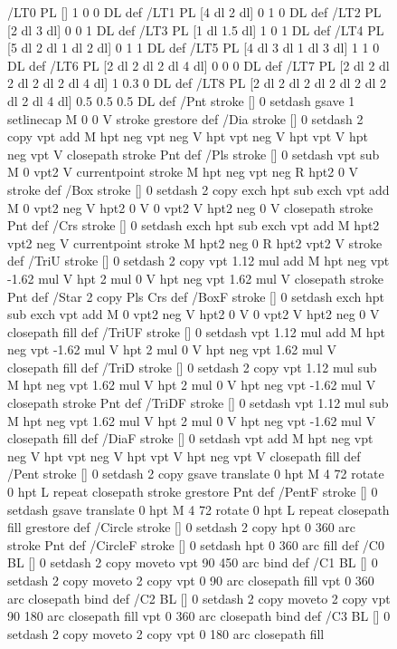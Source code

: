 \documentclass{LMCS}
\begin{document}
\begin{figure}[!tbp]
\begin{minipage}[b]{.47\linewidth}
{{{/LT0 { PL [] 1 0 0 DL } def
/LT1 { PL [4 dl 2 dl] 0 1 0 DL } def
/LT2 { PL [2 dl 3 dl] 0 0 1 DL } def
/LT3 { PL [1 dl 1.5 dl] 1 0 1 DL } def
/LT4 { PL [5 dl 2 dl 1 dl 2 dl] 0 1 1 DL } def
/LT5 { PL [4 dl 3 dl 1 dl 3 dl] 1 1 0 DL } def
/LT6 { PL [2 dl 2 dl 2 dl 4 dl] 0 0 0 DL } def
/LT7 { PL [2 dl 2 dl 2 dl 2 dl 2 dl 4 dl] 1 0.3 0 DL } def
/LT8 { PL [2 dl 2 dl 2 dl 2 dl 2 dl 2 dl 2 dl 4 dl] 0.5 0.5 0.5 DL } def
/Pnt { stroke [] 0 setdash
   gsave 1 setlinecap M 0 0 V stroke grestore } def
/Dia { stroke [] 0 setdash 2 copy vpt add M
  hpt neg vpt neg V hpt vpt neg V
  hpt vpt V hpt neg vpt V closepath stroke
  Pnt } def
/Pls { stroke [] 0 setdash vpt sub M 0 vpt2 V
  currentpoint stroke M
  hpt neg vpt neg R hpt2 0 V stroke
  } def
/Box { stroke [] 0 setdash 2 copy exch hpt sub exch vpt add M
  0 vpt2 neg V hpt2 0 V 0 vpt2 V
  hpt2 neg 0 V closepath stroke
  Pnt } def
/Crs { stroke [] 0 setdash exch hpt sub exch vpt add M
  hpt2 vpt2 neg V currentpoint stroke M
  hpt2 neg 0 R hpt2 vpt2 V stroke } def
/TriU { stroke [] 0 setdash 2 copy vpt 1.12 mul add M
  hpt neg vpt -1.62 mul V
  hpt 2 mul 0 V
  hpt neg vpt 1.62 mul V closepath stroke
  Pnt  } def
/Star { 2 copy Pls Crs } def
/BoxF { stroke [] 0 setdash exch hpt sub exch vpt add M
  0 vpt2 neg V  hpt2 0 V  0 vpt2 V
  hpt2 neg 0 V  closepath fill } def
/TriUF { stroke [] 0 setdash vpt 1.12 mul add M
  hpt neg vpt -1.62 mul V
  hpt 2 mul 0 V
  hpt neg vpt 1.62 mul V closepath fill } def
/TriD { stroke [] 0 setdash 2 copy vpt 1.12 mul sub M
  hpt neg vpt 1.62 mul V
  hpt 2 mul 0 V
  hpt neg vpt -1.62 mul V closepath stroke
  Pnt  } def
/TriDF { stroke [] 0 setdash vpt 1.12 mul sub M
  hpt neg vpt 1.62 mul V
  hpt 2 mul 0 V
  hpt neg vpt -1.62 mul V closepath fill} def
/DiaF { stroke [] 0 setdash vpt add M
  hpt neg vpt neg V hpt vpt neg V
  hpt vpt V hpt neg vpt V closepath fill } def
/Pent { stroke [] 0 setdash 2 copy gsave
  translate 0 hpt M 4 {72 rotate 0 hpt L} repeat
  closepath stroke grestore Pnt } def
/PentF { stroke [] 0 setdash gsave
  translate 0 hpt M 4 {72 rotate 0 hpt L} repeat
  closepath fill grestore } def
/Circle { stroke [] 0 setdash 2 copy
  hpt 0 360 arc stroke Pnt } def
/CircleF { stroke [] 0 setdash hpt 0 360 arc fill } def
/C0 { BL [] 0 setdash 2 copy moveto vpt 90 450  arc } bind def
/C1 { BL [] 0 setdash 2 copy        moveto
       2 copy  vpt 0 90 arc closepath fill
               vpt 0 360 arc closepath } bind def
/C2 { BL [] 0 setdash 2 copy moveto
       2 copy  vpt 90 180 arc closepath fill
               vpt 0 360 arc closepath } bind def
/C3 { BL [] 0 setdash 2 copy moveto
       2 copy  vpt 0 180 arc closepath fill
}}}}
\end{minipage}
\end{figure}
\end{document}
